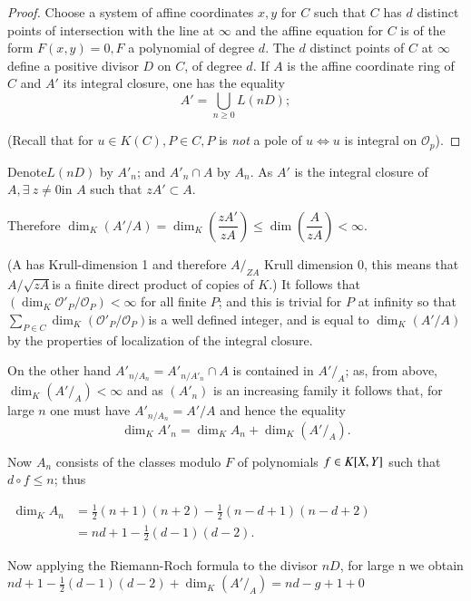 \begin{proof} %
  Choose a system of affine coordinates $x,y$ for $C$ such that  $C$
  has $d$ distinct points of intersection with the line at $\infty$
  and the affine equation for $C$ is of the form $F(x,y)=0, F$ a
  polynomial of degree $d$. The $d$ distinct points of $C$ at $\infty$
  define a positive divisor $D$ on $C$, of degree $d$. If $A$ is the
  affine coordinate ring of $C$ and $A'$ its integral closure, one has
  the equality 
  $$
  A'= \bigcup_{n \geq 0} L (nD);
  $$ 
  
  (Recall that for $ u \in K (C), P \in C, P $ is \textit{ not } a
  pole of $u  \Longleftrightarrow u$ is integral on
  $\mathscr{O}_p$). 
\end{proof}
 
Denote\pageoriginale $L (nD)$ by $ A'_n$;  and  $A'_n \cap A$ by $A_n$.  As $A'$ is
the integral closure of $A, \exists~ z \neq 0 $in $A$ such  that $zA'
\subset A$. 

Therefore $\dim_K (A'/A)= \dim_K \left(\dfrac{zA'} {zA}\right) \leq \dim
\left(\dfrac{A} {zA}\right)< \infty$. 

(A has Krull-dimension 1 and therefore $A/ _{ZA}$ Krull dimension 0,
this means that $A / \sqrt{zA} $is a finite direct product of
copies of $K$.)  It follows that  
$(\dim_K\mathscr{O}'_P/ \mathscr{O}_P) <\infty $  for all finite $P$;
and this is  trivial for $P$ at infinity so that $ \sum\limits _{P \in
  C}   \dim_K (\mathscr{O}'_P/ \mathscr{O}_P)$is a well defined
integer, and is equal to $ \dim_K (A'/A)$ by the properties of
localization of the integral closure.  

On the other hand $ A'_{n/A_n}= A'_{n/A'_n}\cap A$ is contained in $
A'/_A$;  as, from above, $ \dim_K (A'/_A)< \infty $ and as  $(A'_n)$
is an  increasing family it follows that, for large $n$ one must have
$ A'_{n/A_n}= A'/A$  and hence the equality 
$$ 
\dim_K A'_n= \dim_K A_n+ \dim_K (A'/ _A).
$$

Now $A_n$ consists of the classes modulo $F$ of polynomials $ f \in\break K
[X,Y]$ such that $d \circ f \leq n$; thus 

$\begin{aligned}
\dim_K A_n &= \frac{1}{2} (n+1) (n+2)- \frac{1} {2} (n-d+1) (n-d+2) \\
& =  nd+1 - \frac{1}{2} (d-1) (d-2). 
\end{aligned}$

Now applying the Riemann-Roch formula to the divisor $nD$, for large n
we obtain\pageoriginale $ nd+ 1 - \frac{1}{2} (d-1) (d-2)+ \dim_K (A'/_A) =nd-g+1+0$ 

